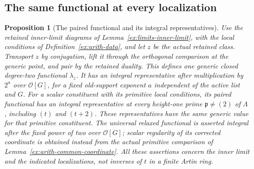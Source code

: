 \documentclass[11pt]{article}
\newtheorem{proposition}[theorem]{Proposition}
\theoremstyle{definition}
\theoremstyle{remark}
\providecommand{\mathscr}[1]{\mathcal{#1}}
\begin{document}
\subsection{The same functional at every localization}
\begin{proposition}[The paired functional and its integral representatives]\label{ex:arith-paired-functional}
Use the retained inner-limit diagrams of
Lemma~\ref{ex:limits-inner-limit}, with the local conditions of
Definition~\ref{ex:arith-data}, and let $z$ be the actual retained
class. Transport $z$ by conjugation, lift it through the orthogonal
comparison at the generic point, and pair by the retained duality.
This defines one generic closed degree-two functional $\lambda_z$.
It has an integral representative after multiplication by $2^a$
over $\mathscr O[G]$, for a fixed old-support exponent $a$
independent of the active list and $G$.
For a scalar constituent with its primitive local conditions, its
paired functional has an integral representative at every height-one
prime $\mathfrak p\ne(2)$ of $\Lambda$, including $(t)$ and $(t+2)$.
These representatives have the same generic value for that primitive
constituent. The universal relaxed functional is asserted integral
after the fixed power of two over $\mathscr O[G]$; scalar regularity
of its corrected coordinate is obtained instead from the actual
primitive comparison of Lemma~\ref{ex:arith-common-coordinate}.
All these assertions concern the inner limit and the indicated
localizations, not inverses of $t$ in a finite Artin ring.
\end{proposition}
\end{document}
